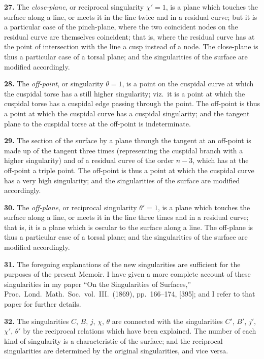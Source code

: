 \documentclass[11pt,a4paper]{article}
\begin{document}
\textbf{27.} The \textit{close-plane}, or reciprocal singularity $\chi'=1$, is a plane which touches the surface along a line, or meets it in the line twice and in a residual curve; but it is a particular case of the pinch-plane, where the two coincident nodes on the residual curve are themselves coincident; that is, where the residual curve has at the point of intersection with the line a cusp instead of a node. The close-plane is thus a particular case of a torsal plane; and the singularities of the surface are modified accordingly.

\textbf{28.} The \textit{off-point}, or singularity $\theta=1$, is a point on the cuspidal curve at which the cuspidal torse has a still higher singularity; viz.\ it is a point at which the cuspidal torse has a cuspidal edge passing through the point. The off-point is thus a point at which the cuspidal curve has a cuspidal singularity; and the tangent plane to the cuspidal torse at the off-point is indeterminate.

\textbf{29.} The section of the surface by a plane through the tangent at an off-point is made up of the tangent three times (representing the cuspidal branch with a higher singularity) and of a residual curve of the order $n-3$, which has at the off-point a triple point. The off-point is thus a point at which the cuspidal curve has a very high singularity; and the singularities of the surface are modified accordingly.

\textbf{30.} The \textit{off-plane}, or reciprocal singularity $\theta'=1$, is a plane which touches the surface along a line, or meets it in the line three times and in a residual curve; that is, it is a plane which is oscular to the surface along a line. The off-plane is thus a particular case of a torsal plane; and the singularities of the surface are modified accordingly.

\textbf{31.} The foregoing explanations of the new singularities are sufficient for the purposes of the present Memoir. I have given a more complete account of these singularities in my paper ``On the Singularities of Surfaces,'' Proc.\ Lond.\ Math.\ Soc.\ vol.\ III.\ (1869), pp.~166--174, [395]; and I refer to that paper for further details.

\textbf{32.} The singularities $C$, $B$, $j$, $\chi$, $\theta$ are connected with the singularities $C'$, $B'$, $j'$, $\chi'$, $\theta'$ by the reciprocal relations which have been explained. The number of each kind of singularity is a characteristic of the surface; and the reciprocal singularities are determined by the original singularities, and vice versa.
\end{document}
